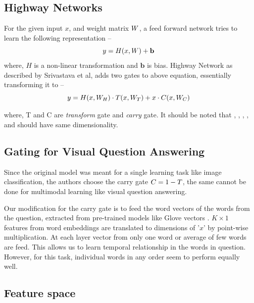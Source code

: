 \subsection{Highway Networks}

For the given input $x$, and weight matrix $\boldmath{W}$, a feed forward network tries to learn the following representation --
\begin{displaymath}
y = H(x, \boldmath{W}) + \mathbf{b}
\end{displaymath}
where, $H$ is a non-linear transformation and $\mathbf{b}$ is bias. Highway Network as described by Srivastava et al\cite{srivastava2015highway}, adds two gates to above equation, essentially transforming it to --
\begin{displaymath}
y = H(x, \boldmath{W_H})\cdot T(x, \boldmath{W_T}) + x \cdot C(x,\boldmath{W_C})
\end{displaymath}



where, T and C are \textit{transform} gate and \textit{carry} gate.  It should be noted that , , , , and  should have same dimensionality.

\subsection{Gating for Visual Question Answering}
Since the original model was meant for a single learning task like image classification, the authors choose the carry gate $\boldmath{C} = \boldmath{1-T}$, the same cannot be done for multimodal learning like visual question answering. 

Our modification for the carry gate is to feed the word vectors of the words from the question, extracted from pre-trained models like Glove vectors\cite{pennington2014glove} . $K\times1$ features from word embeddings are translated to dimensions of '$x$' by point-wise multiplication. At each layer vector from only one word or average of few words are feed. This allows us to learn temporal relationship in the words in question. However, for this task, individual words in any order seem to perform equally well. 

\subsection{Feature space}

